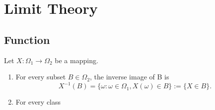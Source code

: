 \chapter{Limit Theory}

\section{Function}

\begin{definition}[Mapping]
    Let $X:\Omega_1\rightarrow\Omega_2$ be a mapping.
    \begin{enumerate}
        \item
              For every subset $B\in\Omega_2$, the inverse image of B is
              \begin{equation*}
                  X^{-1}(B)=\{\omega:\omega\in\Omega_1,X(\omega)\in B\}:=\{X\in B\}.
              \end{equation*}
        \item
              For every class
    \end{enumerate}
\end{definition}
